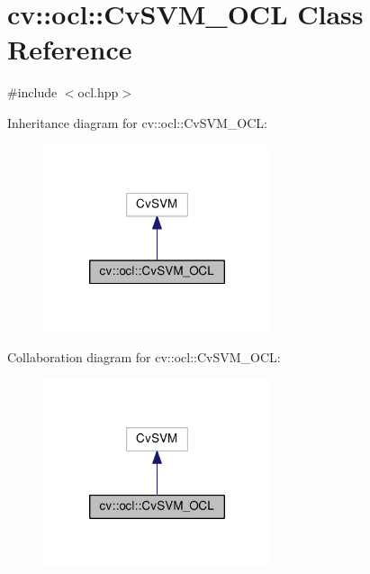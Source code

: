 \hypertarget{classcv_1_1ocl_1_1CvSVM__OCL}{\section{cv\-:\-:ocl\-:\-:Cv\-S\-V\-M\-\_\-\-O\-C\-L Class Reference}
\label{classcv_1_1ocl_1_1CvSVM__OCL}
}


{\ttfamily \#include $<$ocl.\-hpp$>$}



Inheritance diagram for cv\-:\-:ocl\-:\-:Cv\-S\-V\-M\-\_\-\-O\-C\-L\-:\nopagebreak
\begin{figure}[H]
\begin{center}
\leavevmode
\includegraphics[width=190pt]{classcv_1_1ocl_1_1CvSVM__OCL__inherit__graph}
\end{center}
\end{figure}


Collaboration diagram for cv\-:\-:ocl\-:\-:Cv\-S\-V\-M\-\_\-\-O\-C\-L\-:\nopagebreak
\begin{figure}[H]
\begin{center}
\leavevmode
\includegraphics[width=190pt]{classcv_1_1ocl_1_1CvSVM__OCL__coll__graph}
\end{center}
\end{figure}

